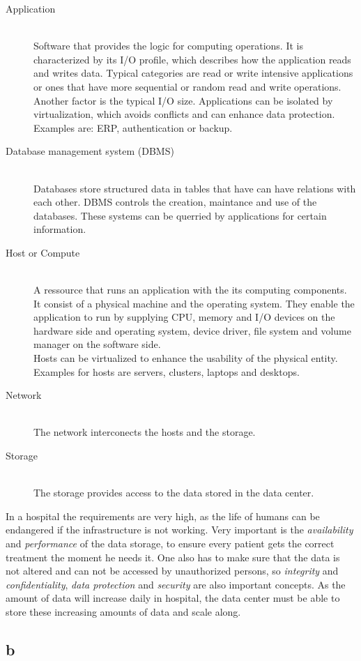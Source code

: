 \documentclass{article}
\begin{document}
	\begin{description}
		\item[Application] \hfill \\
			Software that provides the logic for computing operations.
			It is characterized by its I/O profile,
			which describes how the application reads and writes data.
			Typical categories are read or write intensive applications
			or ones that have more sequential or random read and write operations.
			Another factor is the typical I/O size.
			Applications can be isolated by virtualization,
			which avoids conflicts and can enhance data protection.\\
			Examples are: ERP, authentication or backup.

		\item[Database management system (DBMS)] \hfill \\
			Databases store structured data in tables that have can have relations with each other.
			DBMS controls the creation, maintance and use of the databases.
			These systems can be querried by applications for certain information.
			
		\item[Host or Compute] \hfill \\
			A ressource that runs an application with the its computing components.
			It consist of a physical machine and the operating system.
			They enable the application to run by supplying CPU, memory and I/O devices on the hardware side
			and operating system, device driver, file system and volume manager on the software side.\\
			Hosts can be virtualized to enhance the usability of the physical entity.
			Examples for hosts are servers, clusters, laptops and desktops.

		\item[Network] \hfill \\
			The network interconects the hosts and the storage.

		\item[Storage] \hfill \\
			The storage provides access to the data stored in the data center.
	\end{description}

	In a hospital the requirements are very high,
	as the life of humans can be endangered if the infrastructure is not working.
	Very important is the \emph{availability} and \emph{performance} of the data storage,
	to ensure every patient gets the correct treatment the moment he needs it.
	One also has to make sure that the data is not altered and can not be accessed by unauthorized persons,
	so \emph{integrity} and \emph{confidentiality}, \emph{data protection} and \emph{security} are also important concepts.
	As the amount of data will increase daily in hospital,
	the data center must be able to store these increasing amounts of data and scale along.

\subsection*{b}
\end{document}
